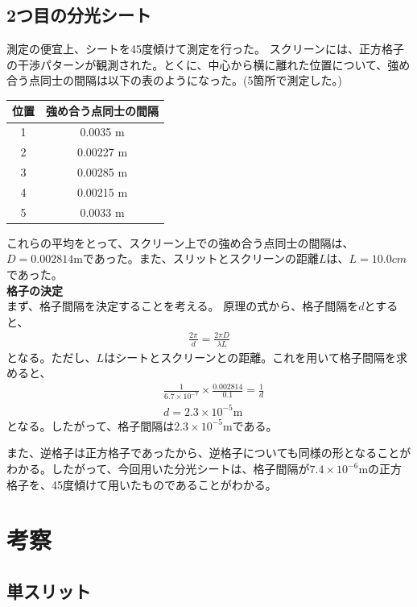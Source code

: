 \documentclass[a4paper,11pt]{jsarticle}
\begin{document}
\subsection{2つ目の分光シート}
測定の便宜上、シートを45度傾けて測定を行った。
スクリーンには、正方格子の干渉パターンが観測された。とくに、中心から横に離れた位置について、強め合う点同士の間隔は以下の表のようになった。(5箇所で測定した。)
\begin{table}[H]
  \centering
  \begin{tabular}{| c | c |}
    \hline
    \textbf{位置} & \textbf{強め合う点同士の間隔} \rule[-5mm]{0mm}{15mm} \\
    \hline
    1 & 0.0035 \si{\meter} \\
    2 & 0.00227 \si{\meter} \\
    3 & 0.00285 \si{\meter} \\
    4 & 0.00215 \si{\meter} \\
    5 & 0.0033 \si{\meter} \\
    \hline
  \end{tabular}
\end{table}
これらの平均をとって、スクリーン上での強め合う点同士の間隔は、$D = 0.002814 \si{\meter}$であった。また、スリットとスクリーンの距離$L$は、$L=10.0 \si{cm}$であった。\\
\textbf{格子の決定}\\
まず、格子間隔を決定することを考える。
原理の式から、格子間隔を$d$とすると、
\begin{align}
  \frac{2\pi}{d} = \frac{2\pi D}{\lambda L}
\end{align}
となる。ただし、$L$はシートとスクリーンとの距離。これを用いて格子間隔を求めると、
\begin{align}
  &\frac{1}{6.7 \times 10^{-7}} \times \frac{0.002814}{0.1} = \frac{1}{d}\\
   &d = 2.3 \times 10^{-5} \si{\meter}
\end{align}
となる。したがって、格子間隔は$2.3 \times 10^{-5} \si{\meter}$である。

また、逆格子は正方格子であったから、逆格子についても同様の形となることがわかる。したがって、今回用いた分光シートは、格子間隔が$7.4 \times 10^{-6} \si{\meter}$の正方格子を、45度傾けて用いたものであることがわかる。

\section{考察}
\subsection{単スリット}
\end{document}
